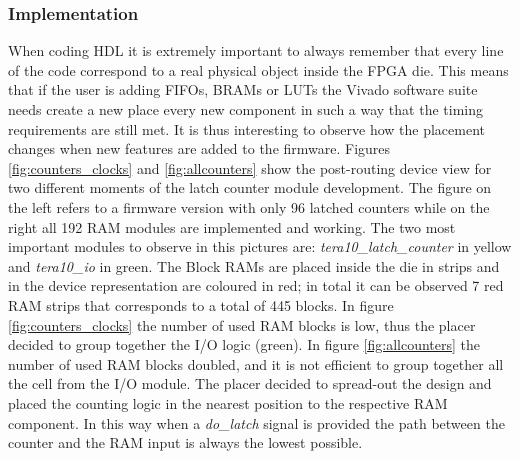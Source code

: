\subsubsection{Implementation}
When coding HDL it is extremely important to always remember that every line of the code correspond to a real physical object inside the FPGA die. This means that if the user is adding FIFOs, BRAMs or LUTs the Vivado software suite needs create a new place every new component in such a way that the timing requirements are still met.
It is thus interesting to observe how the placement changes when new features are added to the firmware.
Figures \ref{fig:counters_clocks} and \ref{fig:allcounters} show the post-routing device view for two different moments of the latch counter module development. The figure on the left refers to a firmware version with only 96 latched counters while on the right all 192 RAM modules are implemented and working.
The two most important modules to observe in this pictures are: \textit{tera10\_latch\_counter} in yellow and \textit{tera10\_io} in green.
The Block RAMs are placed inside the die in strips and in the device representation are coloured in red; in total it can be observed 7 red RAM strips that corresponds to a total of 445 blocks.
In figure \ref{fig:counters_clocks} the number of used RAM blocks is low, thus the placer decided to group together the I/O logic (green).
In figure \ref{fig:allcounters} the number of used RAM blocks doubled, and it is not efficient to group together all the cell from the I/O module. The placer decided to spread-out the design and placed the counting logic in the nearest position to the respective RAM component. In this way when a \textit{do\_latch} signal is provided the path between the counter and the RAM input is always the lowest possible. 
